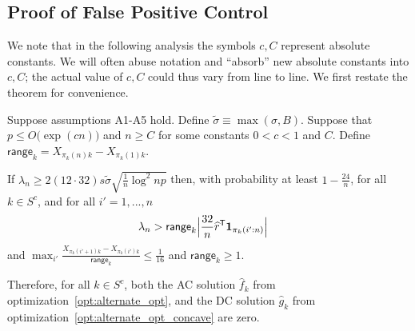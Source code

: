 \documentclass[12pt,pdftex,aos,noinfoline,addressasfootnote]{imsart}
\begin{document}
 
 
 \subsection{Proof of False Positive Control}
 \label{sec:false_positive_proof}
 
 We note that in the following analysis the symbols $c,C$ represent
 absolute constants. We will often abuse notation and ``absorb'' new
 absolute constants into $c, C$; the actual value of $c, C$ could thus
 vary from line to line.
We first restate the theorem for convenience. 

\begin{theorem} 
Suppose assumptions A1-A5 hold. Define $\tilde{\sigma} \equiv \max(\sigma, B)$. Suppose that $p \leq O\big( \exp( c n) \big)$ and $n \geq C$ for some constants $0<c<1$ and $C$. Define $\mathsf{range}_k = X_{\pi_k(n)k} - X_{\pi_k(1)k}$.

If $\lambda_n \geq 2 (12 \cdot 32) s \tilde{\sigma}  \sqrt{ \frac{1}{n} \log^2 np}$ then, with probability at least $ 1 - \frac{24}{n}$, for all $k \in S^c$, and for all $i'=1,...,n$
\begin{align*}
& \lambda_n > \mathsf{range}_k \Big| \frac{32}{n}\widehat{r}^{\mathsf{T}} \mbox{\boldmath $1$}_{\pi_k(i':n)} \Big|  
\end{align*}
and $\max_{i'} \frac{X_{\pi_k(i'+1)k} - X_{\pi_k(i')k}}{\mathsf{range}_k} \leq \frac{1}{16}$ and $\mathsf{range}_k \geq 1$.

Therefore, for all $k \in S^c$, both the AC solution $\hat{f}_k$ from optimization~\ref{opt:alternate_opt}, and the DC solution $\hat{g}_k$ from optimization~\ref{opt:alternate_opt_concave} are zero. 
\end{theorem}
\end{document}
